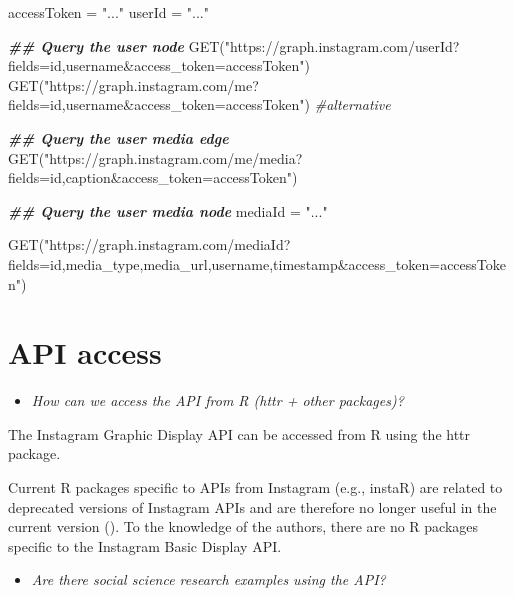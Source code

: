 \documentclass[
]{book}
\newenvironment{Shaded}{\begin{snugshade}}{\end{snugshade}}
\newcommand{\CommentTok}[1]{\textcolor[rgb]{0.56,0.35,0.01}{\textit{#1}}}
\newcommand{\DocumentationTok}[1]{\textcolor[rgb]{0.56,0.35,0.01}{\textbf{\textit{#1}}}}
\newcommand{\FunctionTok}[1]{\textcolor[rgb]{0.00,0.00,0.00}{#1}}
\newcommand{\NormalTok}[1]{#1}
\newcommand{\OtherTok}[1]{\textcolor[rgb]{0.56,0.35,0.01}{#1}}
\newcommand{\StringTok}[1]{\textcolor[rgb]{0.31,0.60,0.02}{#1}}
\providecommand{\tightlist}{%
  \setlength{\itemsep}{0pt}\setlength{\parskip}{0pt}}
\begin{document}
\begin{Shaded}
\begin{Highlighting}[]
\NormalTok{accessToken }\OtherTok{=} \StringTok{"..."}
\NormalTok{userId }\OtherTok{=} \StringTok{"..."}

\DocumentationTok{\#\# Query the user node}
\FunctionTok{GET}\NormalTok{(}\StringTok{"https://graph.instagram.com/userId?fields=id,username\&access\_token=accessToken"}\NormalTok{) }
\FunctionTok{GET}\NormalTok{(}\StringTok{"https://graph.instagram.com/me?fields=id,username\&access\_token=accessToken"}\NormalTok{) }\CommentTok{\#alternative}


\DocumentationTok{\#\# Query the user media edge}
\FunctionTok{GET}\NormalTok{(}\StringTok{"https://graph.instagram.com/me/media?fields=id,caption\&access\_token=accessToken"}\NormalTok{)}

\DocumentationTok{\#\# Query the user media node}
\NormalTok{mediaId }\OtherTok{=} \StringTok{"..."}

\FunctionTok{GET}\NormalTok{(}\StringTok{"https://graph.instagram.com/mediaId?fields=id,media\_type,media\_url,username,timestamp\&access\_token=accessToken"}\NormalTok{)}
\end{Highlighting}
\end{Shaded}

\hypertarget{api-access-6}{%
\section{API access}\label{api-access-6}}

\begin{itemize}
\tightlist
\item
  \emph{How can we access the API from R (httr + other packages)?}
\end{itemize}

The Instagram Graphic Display API can be accessed from R using the httr package.

Current R packages specific to APIs from Instagram (e.g., instaR) are related to deprecated versions of Instagram APIs and are therefore no longer useful in the current version (\citet{Instagram2021-ii}). To the knowledge of the authors, there are no R packages specific to the Instagram Basic Display API.

\begin{itemize}
\tightlist
\item
  \emph{Are there social science research examples using the API?}
\end{itemize}
\end{document}
